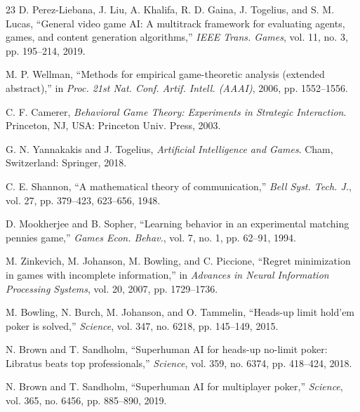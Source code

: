 \documentclass[journal]{IEEEtran}
\begin{document}
\begin{thebibliography}{23}
D. Perez-Liebana, J. Liu, A. Khalifa, R. D. Gaina, J. Togelius, and S. M. Lucas, ``General video game AI: A multitrack framework for evaluating agents, games, and content generation algorithms,'' \emph{IEEE Trans. Games}, vol. 11, no. 3, pp. 195--214, 2019.

M. P. Wellman, ``Methods for empirical game-theoretic analysis (extended abstract),'' in \emph{Proc. 21st Nat. Conf. Artif. Intell. (AAAI)}, 2006, pp. 1552--1556.

C. F. Camerer, \emph{Behavioral Game Theory: Experiments in Strategic Interaction}. Princeton, NJ, USA: Princeton Univ. Press, 2003.

G. N. Yannakakis and J. Togelius, \emph{Artificial Intelligence and Games}. Cham, Switzerland: Springer, 2018.

C. E. Shannon, ``A mathematical theory of communication,'' \emph{Bell Syst. Tech. J.}, vol. 27, pp. 379--423, 623--656, 1948.

D. Mookherjee and B. Sopher, ``Learning behavior in an experimental matching pennies game,'' \emph{Games Econ. Behav.}, vol. 7, no. 1, pp. 62--91, 1994.

M. Zinkevich, M. Johanson, M. Bowling, and C. Piccione, ``Regret minimization in games with incomplete information,'' in \emph{Advances in Neural Information Processing Systems}, vol. 20, 2007, pp. 1729--1736.

M. Bowling, N. Burch, M. Johanson, and O. Tammelin, ``Heads-up limit hold'em poker is solved,'' \emph{Science}, vol. 347, no. 6218, pp. 145--149, 2015.

N. Brown and T. Sandholm, ``Superhuman AI for heads-up no-limit poker: Libratus beats top professionals,'' \emph{Science}, vol. 359, no. 6374, pp. 418--424, 2018.

N. Brown and T. Sandholm, ``Superhuman AI for multiplayer poker,'' \emph{Science}, vol. 365, no. 6456, pp. 885--890, 2019.

\end{thebibliography}
\end{document}
